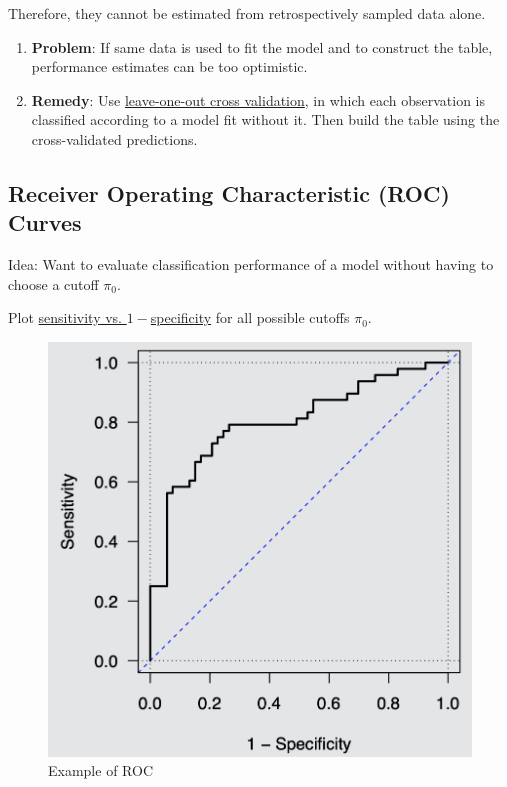 \documentclass[11pt]{elegantbook}
\begin{document}
Therefore, they cannot be estimated from retrospectively sampled data alone.

\begin{enumerate}[-]
    \item \textbf{Problem}: If same data is used to fit the model and to construct the table, performance estimates can be too optimistic.
    \item \textbf{Remedy}: Use \underline{leave-one-out cross validation}, in which each observation is classified according to a model fit without it. Then build the table using the cross-validated predictions.
\end{enumerate}

\subsection{Receiver Operating Characteristic (ROC) Curves}
Idea: Want to evaluate classification performance of a model without having to choose a cutoff $\pi_0$.

Plot \underline{sensitivity vs. $1 - $specificity} for all possible cutoffs $\pi_0$.
\begin{center}\begin{figure}[htbp]
    \centering
    \includegraphics[scale=0.2]{ROC.png}
    \caption{Example of ROC}
    \label{}
\end{figure}\end{center}
\end{document}
